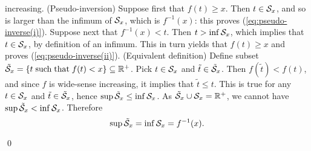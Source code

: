 increasing.
\vspace{1ex}
\noindent (Pseudo-inversion) Suppose
first that $f(t) \geq x$. Then  $t \in \mathcal S_{x}$, and so is
larger than the infimum of $\mathcal S_{x}$, which is $f^{-1}(x)$: this
proves (\ref{eq:pseudo-inverse(i)}).
Suppose next that $f^{-1}(x) < t$. Then  $t > \inf \mathcal S_{x}$, which implies that
$t \in \mathcal S_{x}$, by definition of an infimum. This in turn yields that $f(t) \geq x$
and proves (\ref{eq:pseudo-inverse(ii)}).
%
%
%
%
\vspace{1ex}
\noindent
(Equivalent definition) Define subset $\tilde{\mathcal S}_{x} = \left\{ t \mathrm{\; such \; that \; } f(t) < x \right\} \subseteq \mathbb{R}^{+}$. Pick $t \in \mathcal S_x$ and $\tilde{t} \in \tilde{\mathcal S}_{x}$. Then $f(\tilde{t}) < f(t)$, and since $f$ is wide-sense increasing, it implies that $\tilde{t} \leq t$. This is true for any  $t \in \mathcal S_x$ and $\tilde{t} \in \tilde{\mathcal S}_{x}$, hence $\sup \tilde{\mathcal S}_{x} \leq \inf \mathcal S_{x} $. As $\tilde{\mathcal S}_{x} \cup \mathcal S_{x} = \mathbb{R}^{+}$, we cannot have $\sup \tilde{\mathcal S}_{x} < \inf \mathcal S_{x} $. Therefore
$$ \sup \tilde{\mathcal S}_{x} =  \inf \mathcal S_{x} = f^{-1}(x). $$
%
%

%
\qed
